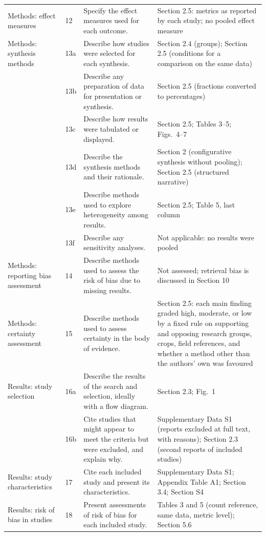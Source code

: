 \documentclass[a4paper,11pt]{article}
\begin{document}
\begin{footnotesize}
\begin{longtable}{@{}L{3.0cm}L{0.8cm}L{6.4cm}L{5.6cm}@{}}
Methods: effect measures & 12 & Specify the effect measures used for each outcome. & Section 2.5: metrics as reported by each study; no pooled effect measure\\
Methods: synthesis methods & 13a & Describe how studies were selected for each synthesis. & Section 2.4 (groups); Section 2.5 (conditions for a comparison on the same data)\\
 & 13b & Describe any preparation of data for presentation or synthesis. & Section 2.5 (fractions converted to percentages)\\
 & 13c & Describe how results were tabulated or displayed. & Section 2.5; Tables 3--5; Figs.~4--7\\
 & 13d & Describe the synthesis methods and their rationale. & Section 2 (configurative synthesis without pooling); Section 2.5 (structured narrative)\\
 & 13e & Describe methods used to explore heterogeneity among results. & Section 2.5; Table 5, last column\\
 & 13f & Describe any sensitivity analyses. & Not applicable: no results were pooled\\
Methods: reporting bias assessment & 14 & Describe methods used to assess the risk of bias due to missing results. & Not assessed; retrieval bias is discussed in Section 10\\
Methods: certainty assessment & 15 & Describe methods used to assess certainty in the body of evidence. & Section 2.5: each main finding graded high, moderate, or low by a fixed rule on supporting and opposing research groups, crops, field references, and whether a method other than the authors' own was favoured\\
Results: study selection & 16a & Describe the results of the search and selection, ideally with a flow diagram. & Section 2.3; Fig.~1\\
 & 16b & Cite studies that might appear to meet the criteria but were excluded, and explain why. & Supplementary Data S1 (reports excluded at full text, with reasons); Section 2.3 (second reports of included studies)\\
Results: study characteristics & 17 & Cite each included study and present its characteristics. & Supplementary Data S1; Appendix Table A1; Section 3.4; Section S4\\
Results: risk of bias in studies & 18 & Present assessments of risk of bias for each included study. & Tables 3 and 5 (count reference, same data, metric level); Section 5.6\\

\end{longtable}
\end{footnotesize}
\end{document}
